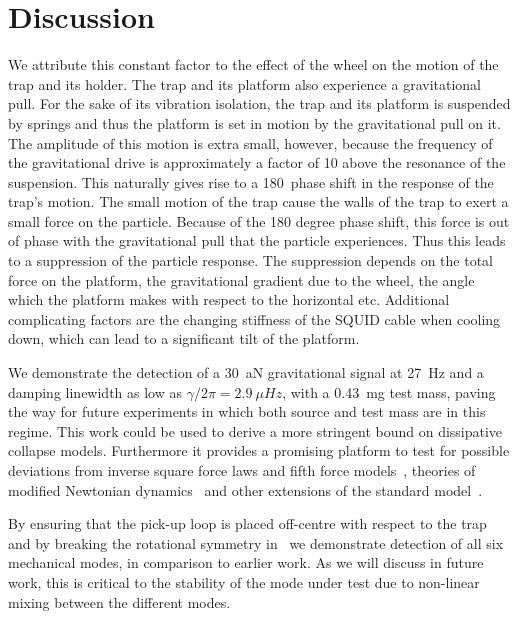\documentclass[pdflatex,sn-mathphys,12pt]{sn-jnl}
\begin{document}
\section{Discussion}\label{sec:conclusions}    
    We attribute this constant factor to the effect of the wheel on the motion of the trap and its holder. The trap and its platform also experience a gravitational pull.  For the sake of its vibration isolation, the trap and its platform is suspended by springs and thus the platform is set in motion by the gravitational pull on it. The amplitude of this motion is extra small, however, because the frequency of the gravitational drive is approximately a factor of 10 above the resonance of the suspension. This naturally gives rise to a 180\textdegree\ phase shift in the response of the trap's motion. The small motion of the trap cause the walls of the trap to exert a small force on the particle. Because of the 180 degree phase shift, this force is out of phase with the gravitational pull that the particle experiences. Thus this leads to a suppression of the particle response. The suppression depends on the total force on the platform, the gravitational gradient due to the wheel, the angle which the platform makes with respect to the horizontal etc. Additional complicating factors are the changing stiffness of the SQUID cable when cooling down, which can lead to a significant tilt of the platform. 
    
%


    We demonstrate the detection of a \SI{30}{aN} gravitational signal at \SI{27}{Hz} and a damping linewidth as low as $\gamma/2\pi = \SI{2.9}{\mu Hz}$, with a \SI{0.43}{mg} test mass, paving the way for future experiments in which both source and test mass are in this regime. This work could be used to derive a more stringent bound on dissipative collapse models. Furthermore it provides a promising platform to test for possible deviations from inverse square force laws and fifth force models~\cite{Blakemore2021, smullin2005}, theories of modified Newtonian dynamics~\cite{milgrom1983, bekenstein2004} and other extensions of the standard model~\cite{carney2021}.
    
    By ensuring that the pick-up loop is placed off-centre with respect to the trap and by breaking the rotational symmetry in \textgamma\ we demonstrate detection of all six mechanical modes, in comparison to earlier work. As we will discuss in future work, this is critical to the stability of the mode under test due to non-linear mixing between the different modes.
    
\end{document}
